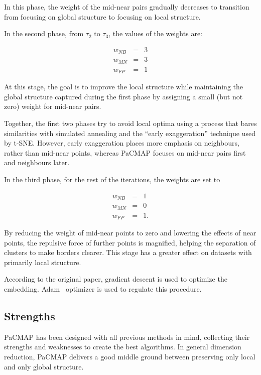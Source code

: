 In this phase, the weight of the mid-near pairs gradually decreases to transition from focusing on global structure to focusing on local structure.

In the second phase, from $\tau_2$ to $\tau_3$, the values of the weights are:

\begin{equation}
	\begin{aligned}
		w_{NB} & = & 3 \\
		w_{MN} & = & 3 \\
		w_{FP} & = & 1
	\end{aligned}
\end{equation}

At this stage, the goal is to improve the local structure while maintaining the global structure captured during the first phase by assigning a small (but not zero) weight for mid-near pairs.

Together, the first two phases try to avoid local optima using a process that bares similarities with simulated annealing and the ``early exaggeration'' technique used by t-SNE. However, early exaggeration places more emphasis on neighbours, rather than mid-near points, whereas PaCMAP focuses on mid-near pairs first and neighbours later.

In the third phase, for the rest of the iterations, the weights are set to

\begin{equation}
	\begin{aligned}
		w_{NB} & = & 1 \\
		w_{MN} & = & 0 \\
		w_{FP} & = & 1.
	\end{aligned}
\end{equation}

By reducing the weight of mid-near points to zero and lowering the effects of near points, the repulsive force of further points is magnified, helping the separation of clusters to make borders clearer. This stage has a greater effect on datasets with primarily local structure.

According to the original paper, gradient descent is used to optimize the embedding. Adam~\cite{bib:adam} optimizer is used to regulate this procedure.

\subsection{Strengths}

PaCMAP has been designed with all previous methods in mind, collecting their strengths and weaknesses to create the best algorithms. In general dimension reduction, PaCMAP delivers a good middle ground between preserving only local and only global structure.

